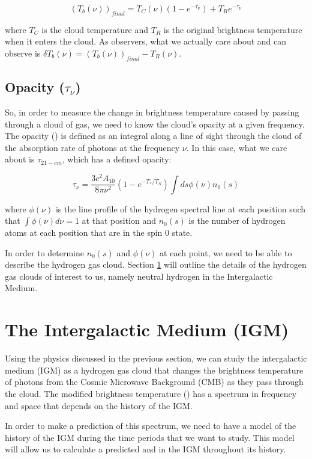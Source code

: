 \begin{equation}\label{Eq:T_bf}
(T_b (\nu))_{final}= T_{C} (\nu) (1-e^{-\tau_\nu}) +T_{R} e^{-\tau_\nu}
\end{equation}

where $T_{C}$ is the cloud temperature and $T_{R}$ is the original brightness temperature when it enters the cloud. As observers, what we actually care about and can observe is $\delta T_b (\nu) = (T_b (\nu))_{final} - T_R  (\nu)$. 

\subsection{Opacity ($\tau_\nu$)}
So, in order to measure the change in brightness temperature caused by passing through a cloud of gas, we need to know the cloud's opacity at a given frequency. The opacity (\tu) is defined as an integral along a line of sight through the cloud of the absorption rate of photons at the frequency $\nu$. In this case, what we care about is $\tau_{21-cm}$, which has a defined opacity:

\begin{equation}
\tau_{\nu} = \frac{3 c^2 A_{10}}{8 \pi \nu^2 } (1-e^{-T_*/T_S}) \int ds \phi (\nu) n_0(s)
\end{equation}

where $\phi (\nu)$ is the line profile of the hydrogen \cm spectral line at each position such that $\int \phi(\nu) d \nu = 1$ at that position and $n_0 (s)$ is the number of hydrogen atoms at each position that are in the spin 0 state. 

In order to determine $n_0 (s)$ and $\phi (\nu)$ at each point, we need to be able to describe the hydrogen gas cloud. Section \ref{Sec:IGM} will outline the details of the hydrogen gas clouds of interest to us, namely neutral hydrogen in the Intergalactic Medium. 


\section{The Intergalactic Medium (IGM)}\label{Sec:IGM}
Using the physics discussed in the previous section, we can study the intergalactic medium (IGM) as a hydrogen gas cloud that changes the brightness temperature of photons from the Cosmic Microwave Background (CMB) as they pass through the cloud. The modified brightness temperature (\dtb) has a spectrum in frequency and space that depends on the history of the IGM. 

In order to make a prediction of this spectrum, we need to have a model of the history of the IGM during the time periods that we want to study. This model will allow us to calculate a predicted \ts and \tu in the IGM throughout its history. 

